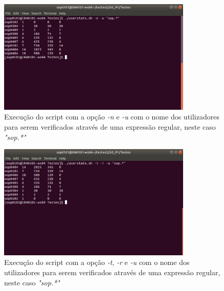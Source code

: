 \documentclass[10pt,portuguese]{article}
\begin{document}
\begin{figure}[!h]
    \centering
    \includegraphics[width=350]{Resultados/user_n_u.jpeg}
    \caption{Execução do script com a opção \textit{-n} e \textit{-u} com o nome dos utilizadores para serem verificados através de uma expressão regular, neste caso \textit{"sop.*"}}
\end{figure}

\begin{figure}[!h]
    \centering
    \includegraphics[width=350]{Resultados/user_t_r_u.jpeg}
    \caption{Execução do script com a opção \textit{-t}, \textit{-r} e \textit{-u} com o nome dos utilizadores para serem verificados através de uma expressão regular, neste caso \textit{"sop.*"}}
\end{figure}
\end{document}
